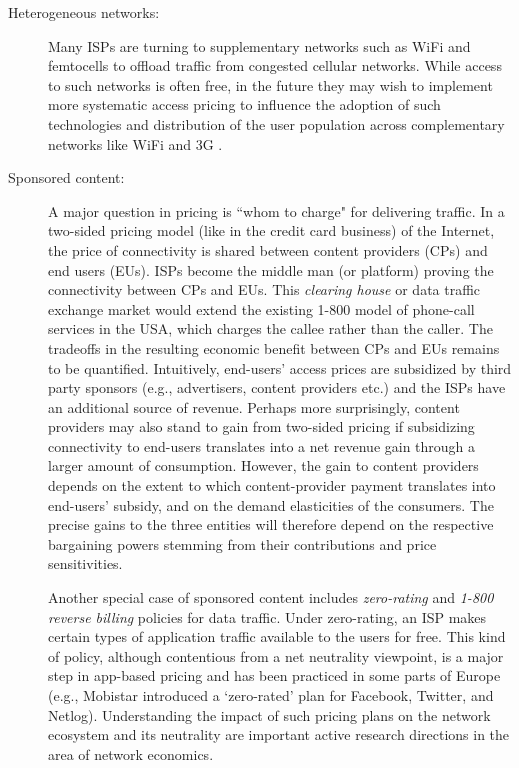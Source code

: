 \begin{description}
\item[Heterogeneous networks:] Many ISPs are turning to supplementary networks such as WiFi and femtocells to offload traffic from congested cellular networks. While access to such networks is often free, in the future they may wish to implement more systematic access pricing to influence the adoption of such technologies and distribution of the user population across complementary networks like WiFi and 3G \cite{wifi-3g-infocom,Im}.

\item[Sponsored content:] A major question in pricing is ``whom to charge" for delivering traffic. In a two-sided pricing model (like in the credit card business) of the Internet, the price of connectivity is shared between content providers (CPs) and end users (EUs). ISPs become the middle man (or platform) proving the connectivity between CPs and EUs. This \emph{clearing house} or data traffic exchange market would extend the existing 1-800 model of phone-call services in the USA, which charges the callee rather than the caller. The tradeoffs in the resulting economic benefit between CPs and EUs remains to be quantified. Intuitively, end-users' access prices are subsidized by third party sponsors (e.g., advertisers, content providers etc.) and the ISPs have an additional source of revenue. Perhaps more surprisingly, content providers may also stand to gain from two-sided pricing if subsidizing connectivity to end-users translates into a net revenue gain through a larger amount of consumption. However, the gain to content providers depends on the extent to which content-provider payment translates into end-users' subsidy, and on the demand elasticities of the consumers. The precise gains to the three entities will therefore depend on the respective bargaining powers stemming from their contributions and price sensitivities.

Another special case of sponsored content includes \emph{zero-rating} and \emph{1-800 reverse billing} policies for data traffic. Under zero-rating, an ISP makes certain types of application traffic available to the users for free. This kind of policy, although contentious from a net neutrality viewpoint, is a major step in app-based pricing and has been practiced in some parts of Europe (e.g., Mobistar introduced a `zero-rated' plan for Facebook, Twitter, and Netlog). Understanding the impact of such pricing plans on the network ecosystem and its neutrality are important active research directions in the area of network economics.  

\end{description}

